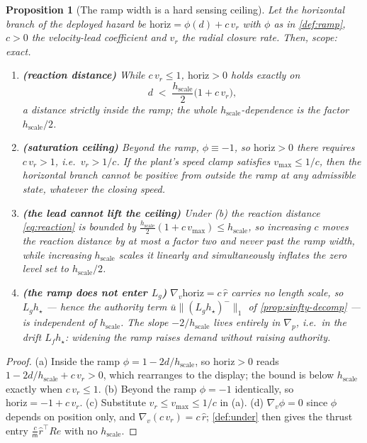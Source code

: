 \documentclass[11pt]{article}
\theoremstyle{plain}
\newtheorem{proposition}[theorem]{Proposition}
\theoremstyle{definition}
\theoremstyle{remark}
\newcommand{\mass}{\mathsf m}
\newcommand{\Lg}{L_g}
\newcommand{\Lf}{L_f}
\newcommand{\grad}{\nabla}
\newcommand{\bignormone}[1]{\lVert#1\rVert_1}
\begin{document}
\begin{proposition}[The ramp width is a hard sensing ceiling]\label{prop:ramp-ceiling}
Let the horizontal branch of the deployed hazard be $\mathrm{horiz}=\phi(d)+c\,v_r$ with
$\phi$ as in \cref{def:ramp}, $c>0$ the velocity-lead coefficient and $v_r$ the radial closure
rate. Then, scope: exact.
\begin{enumerate}[label=(\alph*)]
  \item \textbf{(reaction distance)} While $c\,v_r\le1$, $\mathrm{horiz}>0$ holds exactly on
  \begin{equation}\label{eq:reaction}
  d\;<\;\frac{h_{\mathrm{scale}}}{2}\big(1+c\,v_r\big),
  \end{equation}
  a distance strictly inside the ramp; the whole $h_{\mathrm{scale}}$-dependence is the factor
  $h_{\mathrm{scale}}/2$.
  \item \textbf{(saturation ceiling)} Beyond the ramp, $\phi\equiv-1$, so $\mathrm{horiz}>0$
  there requires $c\,v_r>1$, i.e.\ $v_r>1/c$. If the plant's speed clamp satisfies
  $v_{\max}\le1/c$, then the horizontal branch \emph{cannot} be positive from outside the ramp
  at any admissible state, whatever the closing speed.
  \item \textbf{(the lead cannot lift the ceiling)} Under (b) the reaction distance
  \cref{eq:reaction} is bounded by $\tfrac{h_{\mathrm{scale}}}{2}(1+c\,v_{\max})\le
  h_{\mathrm{scale}}$, so increasing $c$ moves the reaction distance by at most a factor two
  and never past the ramp width, while increasing $h_{\mathrm{scale}}$ scales it linearly and
  simultaneously inflates the zero level set to $h_{\mathrm{scale}}/2$.
  \item \textbf{(the ramp does not enter $\Lg$)} $\grad_v\mathrm{horiz}=c\,\hat r$ carries no
  length scale, so $\Lg h_\star$ --- hence the authority term
  $\bar u\bignormone{(\Lg h_\star)^-}$ of \cref{prop:sinfty-decomp} --- is independent of
  $h_{\mathrm{scale}}$. The slope $-2/h_{\mathrm{scale}}$ lives entirely in $\grad_p$, i.e.\ in
  the drift $\Lf h_\star$: widening the ramp raises demand without raising authority.
\end{enumerate}
\end{proposition}
\begin{proof}
(a) Inside the ramp $\phi=1-2d/h_{\mathrm{scale}}$, so $\mathrm{horiz}>0$ reads
$1-2d/h_{\mathrm{scale}}+c\,v_r>0$, which rearranges to the display; the bound is below
$h_{\mathrm{scale}}$ exactly when $c\,v_r\le1$. (b) Beyond the ramp $\phi=-1$ identically, so
$\mathrm{horiz}=-1+c\,v_r$. (c) Substitute $v_r\le v_{\max}\le1/c$ in (a). (d)
$\grad_v\phi=0$ since $\phi$ depends on position only, and $\grad_v(c\,v_r)=c\,\hat r$;
\cref{def:under} then gives the thrust entry $\tfrac{c}{\mass}\hat r^\top Re$ with no
$h_{\mathrm{scale}}$.
\end{proof}
\end{document}
